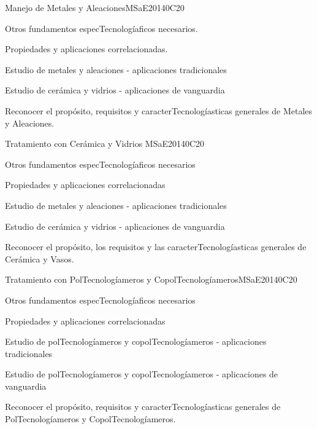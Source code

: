 \begin{syllabus}
\begin{unit}{Manejo de Metales y Aleaciones}{}{MSaE2014}{0}{C20}
\begin{topics}
      \item Otros fundamentos especTecnologíaficos necesarios.
      \item Propiedades y aplicaciones correlacionadas.
      \item Estudio de metales y aleaciones - aplicaciones tradicionales
      \item Estudio de cerámica y vidrios - aplicaciones de vanguardia
\end{topics}
   \begin{learningoutcomes}
      \item Reconocer el propósito, requisitos y caracterTecnologíasticas generales de Metales y Aleaciones.
   \end{learningoutcomes}
\end{unit}


\begin{unit}{Tratamiento con Cerámica y Vidrios }{}{MSaE2014}{0}{C20}
\begin{topics}
      \item Otros fundamentos especTecnologíaficos necesarios
      \item Propiedades y aplicaciones correlacionadas
      \item Estudio de metales y aleaciones - aplicaciones tradicionales
      \item Estudio de cerámica y vidrios - aplicaciones de vanguardia
\end{topics}
   \begin{learningoutcomes}

      \item Reconocer el propósito, los requisitos y las caracterTecnologíasticas generales de Cerámica y Vasos.
   \end{learningoutcomes}
\end{unit}

\begin{unit}{Tratamiento con PolTecnologíameros y CopolTecnologíameros}{}{MSaE2014}{0}{C20}
\begin{topics}
      \item Otros fundamentos especTecnologíaficos necesarios
      \item Propiedades y aplicaciones correlacionadas
      \item Estudio de polTecnologíameros y copolTecnologíameros - aplicaciones tradicionales
      \item Estudio de polTecnologíameros y copolTecnologíameros - aplicaciones de vanguardia
\end{topics}
   \begin{learningoutcomes}
      \item Reconocer el propósito, requisitos y caracterTecnologíasticas generales de PolTecnologíameros y CopolTecnologíameros.
   \end{learningoutcomes}
\end{unit}


\end{syllabus}
